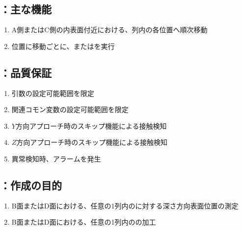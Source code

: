 \subsection{\DLtwoAC：主な機能}
\begin{enumerate}[label*=\sarrow]
\item A側またはC側の内表面付近における、列内の各\Dimple 位置へ順次移動
\item \Dimple 位置に移動ごとに、\DMLthreeAC または\DKLthreeAC を実行
\end{enumerate}


\clearpage
\subsection{\DLtwoAC：品質保証}
\begin{enumerate}[label*=\sarrow]
\item {}引数の設定可能範囲を限定
\item 関連コモン変数の設定可能範囲を限定
\item $Y$方向アプローチ時のスキップ機能による接触検知
\item $Z$方向アプローチ時のスキップ機能による接触検知
\item 異常検知時、アラームを発生
\end{enumerate}



\clearpage


\subsection{\DLtwoBD：作成の目的}
\begin{enumerate}[label*=\sarrow]
\item B面またはD面における、任意の1列内の\Dimple に対する深さ方向表面位置の測定
\item B面またはD面における、任意の1列内の\Dimple の加工
\end{enumerate}


